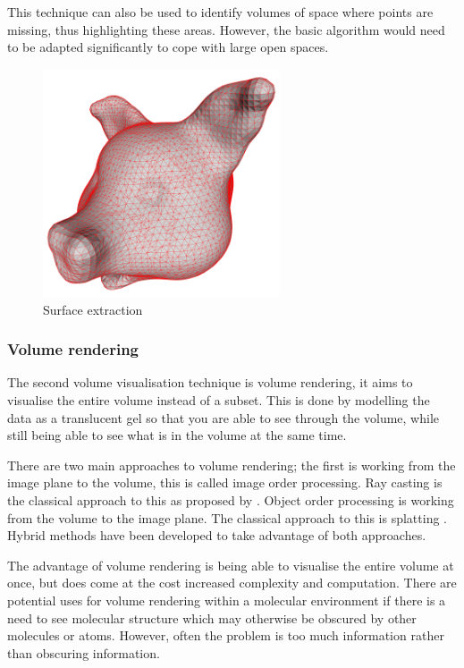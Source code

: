 This technique can also be used to identify volumes of space where points are
missing, thus highlighting these areas. However, the basic algorithm would need
to be adapted significantly to cope with large open spaces.

\begin{figure}[h!]
  \begin{center}
    \includegraphics[width=70mm]{triangulated_mesh}
  \end{center}
  \caption{Surface extraction}
  \label{fig:triangulatedmesh}
\end{figure}


\subsubsection*{Volume rendering}
\label{ssub:volume_rendering}

The second volume visualisation technique is volume rendering, it aims to
visualise the entire volume instead of a subset. This is done by modelling the
data as a translucent gel so that you are able to see through the volume, while
still being able to see what is in the volume at the same time.

There are two main approaches to volume rendering; the first is working from the
image plane to the volume, this is called image order processing. Ray casting is
the classical approach to this as proposed by \citet{levoy88}. Object order
processing is working from the volume to the image plane. The classical approach
to this is splatting \citep{westover89}. Hybrid methods have been developed to
take advantage of both approaches.

The advantage of volume rendering is being able to visualise the entire volume
at once, but does come at the cost increased complexity and computation. There
are potential uses for volume rendering within a molecular environment if there
is a need to see molecular structure which may otherwise be obscured by other
molecules or atoms. However, often the problem is too much information rather
than obscuring information.


